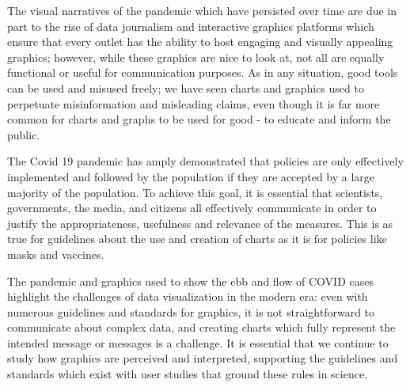 \documentclass[article]{jdssv}\usepackage[]{graphicx}\usepackage[]{xcolor}
\begin{document}
The visual narratives of the pandemic which have persisted over time are due in part to the rise of data journalism and interactive graphics platforms which ensure that every outlet has the ability to host engaging and visually appealing graphics; however, while these graphics are nice to look at, not all are equally functional or useful for communication purposes. As in any situation, good tools can be used and misused freely; we have seen charts and graphics used to perpetuate misinformation and misleading claims, even though it is far more common for charts and graphs to be used for good - to educate and inform the public.

The Covid 19 pandemic has amply demonstrated that policies are only effectively implemented and followed by the population if they are accepted by a large majority of the population. To achieve this goal, it is essential that scientists, governments, the media, and citizens all effectively communicate in order to justify the appropriateness, usefulness and relevance of the measures. This is as true for guidelines about the use and creation of charts as it is for policies like masks and vaccines. %

The pandemic and graphics used to show the ebb and flow of COVID cases highlight the challenges of data visualization in the modern era: even with numerous guidelines and standards for graphics, it is not straightforward to communicate about complex data, and creating charts which fully represent the intended message or messages is a challenge. It is essential that we continue to study how graphics are perceived and interpreted, supporting the guidelines and standards which exist with user studies that ground these rules in science. 


\end{document}

